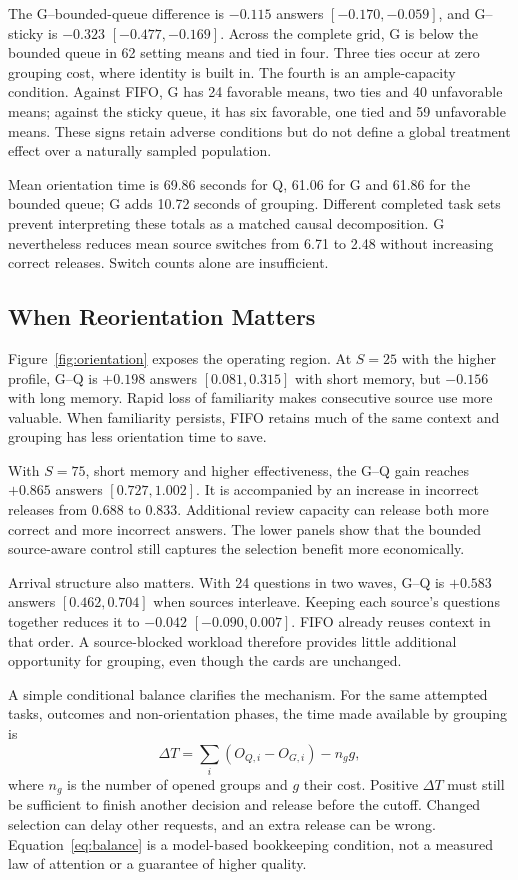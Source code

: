 \documentclass[a4paper,twoside]{article}
\begin{document}
The G--bounded-queue difference is $-0.115$ answers $[-0.170,-0.059]$, and G--sticky is $-0.323$ $[-0.477,-0.169]$. Across the complete grid, G is below the bounded queue in 62 setting means and tied in four. Three ties occur at zero grouping cost, where identity is built in. The fourth is an ample-capacity condition. Against FIFO, G has 24 favorable means, two ties and 40 unfavorable means; against the sticky queue, it has six favorable, one tied and 59 unfavorable means. These signs retain adverse conditions but do not define a global treatment effect over a naturally sampled population.

Mean orientation time is 69.86 seconds for Q, 61.06 for G and 61.86 for the bounded queue; G adds 10.72 seconds of grouping. Different completed task sets prevent interpreting these totals as a matched causal decomposition. G nevertheless reduces mean source switches from 6.71 to 2.48 without increasing correct releases. Switch counts alone are insufficient.

\subsection{When Reorientation Matters}
Figure~\ref{fig:orientation} exposes the operating region. At $S=25$ with the higher profile, G--Q is $+0.198$ answers $[0.081,0.315]$ with short memory, but $-0.156$ with long memory. Rapid loss of familiarity makes consecutive source use more valuable. When familiarity persists, FIFO retains much of the same context and grouping has less orientation time to save.



With $S=75$, short memory and higher effectiveness, the G--Q gain reaches $+0.865$ answers $[0.727,1.002]$. It is accompanied by an increase in incorrect releases from 0.688 to 0.833. Additional review capacity can release both more correct and more incorrect answers. The lower panels show that the bounded source-aware control still captures the selection benefit more economically.

Arrival structure also matters. With 24 questions in two waves, G--Q is $+0.583$ answers $[0.462,0.704]$ when sources interleave. Keeping each source's questions together reduces it to $-0.042$ $[-0.090,0.007]$. FIFO already reuses context in that order. A source-blocked workload therefore provides little additional opportunity for grouping, even though the cards are unchanged.

A simple conditional balance clarifies the mechanism. For the same attempted tasks, outcomes and non-orientation phases, the time made available by grouping is
\begin{equation}
 \Delta T = \sum_i(O_{Q,i}-O_{G,i})-n_g g,
 \label{eq:balance}
\end{equation}
where $n_g$ is the number of opened groups and $g$ their cost. Positive $\Delta T$ must still be sufficient to finish another decision and release before the cutoff. Changed selection can delay other requests, and an extra release can be wrong. Equation~\ref{eq:balance} is a model-based bookkeeping condition, not a measured law of attention or a guarantee of higher quality.
\end{document}
